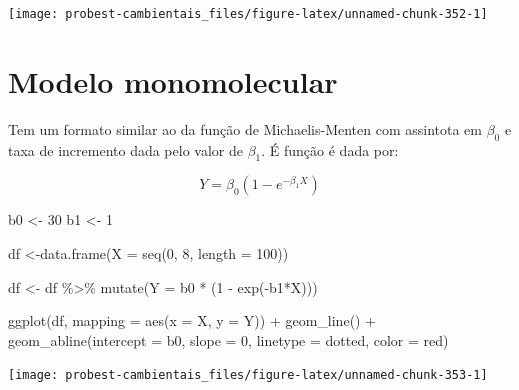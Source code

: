 \documentclass[
]{book}
\newenvironment{Shaded}{\begin{snugshade}}{\end{snugshade}}
\newcommand{\AttributeTok}[1]{\textcolor[rgb]{0.77,0.63,0.00}{#1}}
\newcommand{\DecValTok}[1]{\textcolor[rgb]{0.00,0.00,0.81}{#1}}
\newcommand{\FunctionTok}[1]{\textcolor[rgb]{0.00,0.00,0.00}{#1}}
\newcommand{\NormalTok}[1]{#1}
\newcommand{\OtherTok}[1]{\textcolor[rgb]{0.56,0.35,0.01}{#1}}
\newcommand{\SpecialCharTok}[1]{\textcolor[rgb]{0.00,0.00,0.00}{#1}}
\newcommand{\StringTok}[1]{\textcolor[rgb]{0.31,0.60,0.02}{#1}}
\begin{document}
\begin{center}\texttt{[image: probest-cambientais\_files/figure-latex/unnamed-chunk-352-1]} \end{center}

\hypertarget{modelo-monomolecular}{%
\section{Modelo monomolecular}\label{modelo-monomolecular}}

Tem um formato similar ao da função de Michaelis-Menten com assintota em \(\beta_0\) e taxa de incremento dada pelo valor de \(\beta_1\). É função é dada por:

\[Y = \beta_0 (1 - e^{-\beta_1 X})\]

\begin{Shaded}
\begin{Highlighting}[]
\NormalTok{b0 }\OtherTok{\textless{}{-}} \DecValTok{30}
\NormalTok{b1 }\OtherTok{\textless{}{-}} \DecValTok{1}

\NormalTok{df }\OtherTok{\textless{}{-}}\FunctionTok{data.frame}\NormalTok{(}\AttributeTok{X =} \FunctionTok{seq}\NormalTok{(}\DecValTok{0}\NormalTok{, }\DecValTok{8}\NormalTok{, }\AttributeTok{length =} \DecValTok{100}\NormalTok{))}

\NormalTok{df }\OtherTok{\textless{}{-}}\NormalTok{ df }\SpecialCharTok{\%\textgreater{}\%} \FunctionTok{mutate}\NormalTok{(}\AttributeTok{Y =}\NormalTok{ b0 }\SpecialCharTok{*}\NormalTok{ (}\DecValTok{1} \SpecialCharTok{{-}} \FunctionTok{exp}\NormalTok{(}\SpecialCharTok{{-}}\NormalTok{b1}\SpecialCharTok{*}\NormalTok{X)))}

\FunctionTok{ggplot}\NormalTok{(df, }\AttributeTok{mapping =} \FunctionTok{aes}\NormalTok{(}\AttributeTok{x =}\NormalTok{ X, }\AttributeTok{y =}\NormalTok{ Y)) }\SpecialCharTok{+}
  \FunctionTok{geom\_line}\NormalTok{() }\SpecialCharTok{+}
  \FunctionTok{geom\_abline}\NormalTok{(}\AttributeTok{intercept =}\NormalTok{ b0, }\AttributeTok{slope =} \DecValTok{0}\NormalTok{, }\AttributeTok{linetype =} \StringTok{\textquotesingle{}dotted\textquotesingle{}}\NormalTok{, }\AttributeTok{color =} \StringTok{\textquotesingle{}red\textquotesingle{}}\NormalTok{)}
\end{Highlighting}
\end{Shaded}

\begin{center}\texttt{[image: probest-cambientais\_files/figure-latex/unnamed-chunk-353-1]} \end{center}
\end{document}
